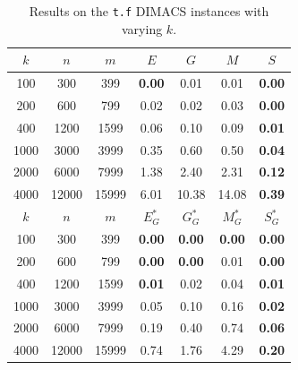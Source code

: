 \begin{table}
\centering
\begin{tabular}{
ccc|cccc}
$k$ & $n$ & $m$ & $E$ & $G$ & $M$ & $S$ \\
\hline
100 & 300 & 399 & \textbf{0.00} & 0.01 & 0.01 & \textbf{0.00} \\
200 & 600 & 799 & 0.02 & 0.02 & 0.03 & \textbf{0.00} \\
400 & 1200 & 1599 & 0.06 & 0.10 & 0.09 & \textbf{0.01} \\
1000 & 3000 & 3999 & 0.35 & 0.60 & 0.50 & \textbf{0.04} \\
2000 & 6000 & 7999 & 1.38 & 2.40 & 2.31 & \textbf{0.12} \\
4000 & 12000 & 15999 & 6.01 & 10.38 & 14.08 & \textbf{0.39} \\
\hline
$k$ & $n$ & $m$ & $E^*_G$ & $G^*_G$ & $M^*_G$ & $S^*_G$ \\
\hline
100 & 300 & 399 & \textbf{0.00} & \textbf{0.00} & \textbf{0.00} & \textbf{0.00} \\
200 & 600 & 799 & \textbf{0.00} & \textbf{0.00} & 0.01 & \textbf{0.00} \\
400 & 1200 & 1599 & \textbf{0.01} & 0.02 & 0.04 & \textbf{0.01} \\
1000 & 3000 & 3999 & 0.05 & 0.10 & 0.16 & \textbf{0.02} \\
2000 & 6000 & 7999 & 0.19 & 0.40 & 0.74 & \textbf{0.06} \\
4000 & 12000 & 15999 & 0.74 & 1.76 & 4.29 & \textbf{0.20} \\
\end{tabular}
\caption{Results on the \texttt{t.f} DIMACS instances with varying $k$.}\label{tab:t}
\end{table}

